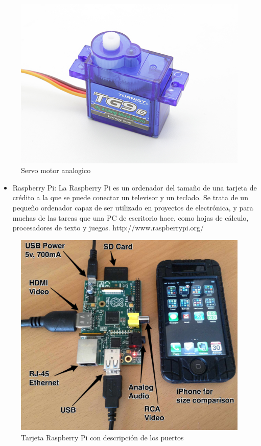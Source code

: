 \begin{figure}[hbtp]
\caption{Servo motor analogico}
\centering
\includegraphics[scale=0.3]{imagenes/turnigy.jpg}
\end{figure}

\begin{itemize}
\item Raspberry Pi: La Raspberry Pi es un ordenador del tamaño de una tarjeta de crédito a la que se puede conectar un televisor y un teclado. Se trata de un pequeño ordenador capaz de ser utilizado en proyectos de electrónica, y para muchas de las tareas que una PC de escritorio hace, como hojas de cálculo, procesadores de texto y juegos. http://www.raspberrypi.org/ 




\end{itemize}
\begin{figure}[hbtp]
\caption{Tarjeta Raspberry Pi con descripción de los puertos}
\centering
\includegraphics[scale=0.1]{imagenes/raspberry_pi_iphone.jpg}
\end{figure}

